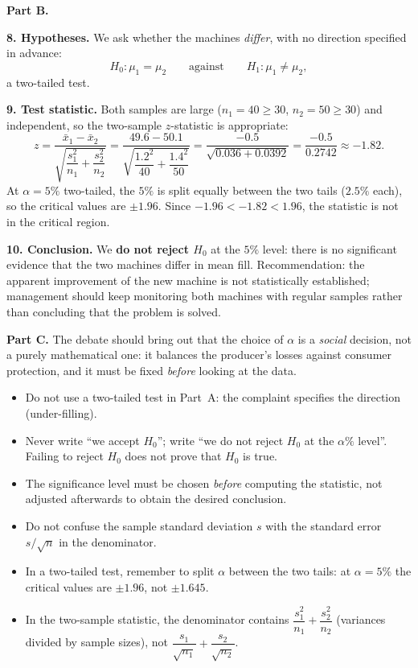 \documentclass[11pt]{article}
\newcommand{\cle}[1]{{\popxbold\color{popdark}#1}}
\begin{document}
\textbf{Part B.}

\textbf{8. Hypotheses.} We ask whether the machines \emph{differ}, with no direction specified in advance:
\[
H_0 : \mu_1 = \mu_2 \qquad \text{against} \qquad H_1 : \mu_1 \neq \mu_2,
\]
a \cle{two-tailed} test.

\textbf{9. Test statistic.} Both samples are large ($n_1 = 40 \geq 30$, $n_2 = 50 \geq 30$) and independent, so the two-sample $z$-statistic is appropriate:
\[
z = \frac{\bar{x}_1 - \bar{x}_2}{\sqrt{\dfrac{s_1^2}{n_1}+\dfrac{s_2^2}{n_2}}}
= \frac{49.6 - 50.1}{\sqrt{\dfrac{1.2^2}{40}+\dfrac{1.4^2}{50}}}
= \frac{-0.5}{\sqrt{0.036 + 0.0392}}
= \frac{-0.5}{0.2742} \approx -1.82.
\]
At $\alpha = 5\%$ two-tailed, the $5\%$ is split equally between the two tails ($2.5\%$ each), so the critical values are $\pm 1.96$. Since $-1.96 < -1.82 < 1.96$, the statistic is not in the critical region.

\textbf{10. Conclusion.} We \textbf{do not reject $H_0$} at the $5\%$ level: there is no significant evidence that the two machines differ in mean fill. Recommendation: the apparent improvement of the new machine is not statistically established; management should keep monitoring both machines with regular samples rather than concluding that the problem is solved.

\textbf{Part C.} The debate should bring out that the choice of $\alpha$ is a \emph{social} decision, not a purely mathematical one: it balances the producer's losses against consumer protection, and it must be fixed \emph{before} looking at the data.

\begin{attention}
\begin{itemize}
\item Do not use a two-tailed test in Part~A: the complaint specifies the direction (under-filling).
\item Never write ``we accept $H_0$''; write ``we do not reject $H_0$ at the $\alpha\%$ level''. Failing to reject $H_0$ does not prove that $H_0$ is true.
\item The significance level must be chosen \emph{before} computing the statistic, not adjusted afterwards to obtain the desired conclusion.
\item Do not confuse the sample standard deviation $s$ with the standard error $s/\sqrt{n}$ in the denominator.
\item In a two-tailed test, remember to split $\alpha$ between the two tails: at $\alpha = 5\%$ the critical values are $\pm 1.96$, not $\pm 1.645$.
\item In the two-sample statistic, the denominator contains $\dfrac{s_1^2}{n_1}+\dfrac{s_2^2}{n_2}$ (variances divided by sample sizes), not $\dfrac{s_1}{\sqrt{n_1}}+\dfrac{s_2}{\sqrt{n_2}}$.
\end{itemize}
\end{attention}
\end{document}
